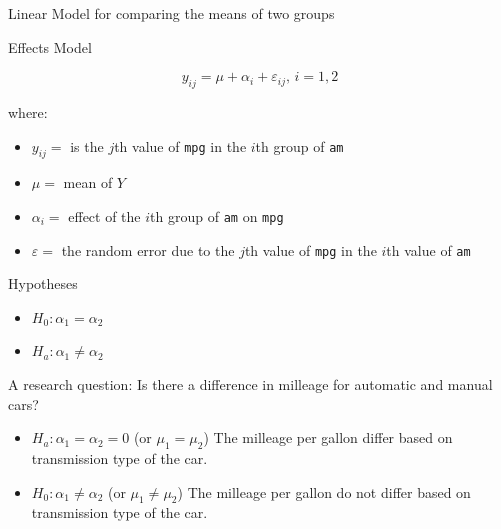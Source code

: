 \begin{frame}[fragile]{Linear Model for comparing the means of two
groups}

\begin{block}{Effects Model}

\[y_{ij} = \mu + \alpha_i + \varepsilon_{ij},\, i = 1,2\]

where:

\begin{itemize}
\tightlist
\item
  \(y_{ij}=\) is the \(j\)th value of \texttt{mpg} in the \(i\)th group
  of \texttt{am}
\item
  \(\mu=\) mean of \(Y\)
\item
  \(\alpha_i = \) effect of the \(i\)th group of \texttt{am} on
  \texttt{mpg}
\item
  \(\varepsilon=\) the random error due to the \(j\)th value of
  \texttt{mpg} in the \(i\)th value of \texttt{am}
\end{itemize}

\end{block}

\begin{block}{Hypotheses}

\begin{itemize}
\tightlist
\item
  \(H_0: \alpha_1 = \alpha_2\)
\item
  \(H_a: \alpha_1\neq\alpha_2\)
\end{itemize}

\end{block}

\end{frame}

\begin{frame}{A research question: Is there a difference in milleage for
automatic and manual cars?}

\begin{itemize}
\item
  \(H_a: \alpha_1=\alpha_2=0\) (or \(\mu_1=\mu_2\)) The milleage per
  gallon differ based on transmission type of the car.
\item
  \(H_0: \alpha_1\neq\alpha_2\) (or \(\mu_1\neq\mu_2\)) The milleage per
  gallon do not differ based on transmission type of the car.
\end{itemize}

\end{frame}

